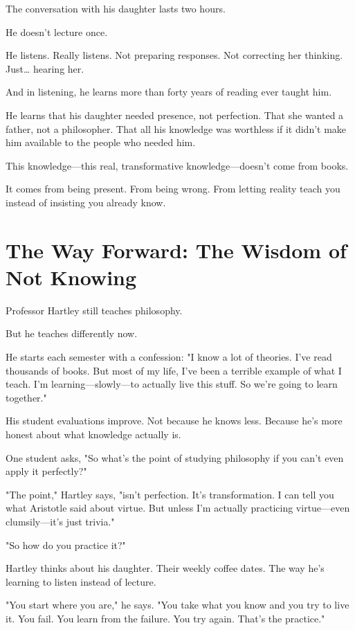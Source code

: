 \documentclass[11pt,twoside]{book}
\begin{document}
The conversation with his daughter lasts two hours.

He doesn't lecture once.

He listens. Really listens. Not preparing responses. Not correcting her thinking. Just\ldots{} hearing her.

And in listening, he learns more than forty years of reading ever taught him.

He learns that his daughter needed presence, not perfection. That she wanted a father, not a philosopher. That all his knowledge was worthless if it didn't make him available to the people who needed him.

This knowledge—this real, transformative knowledge—doesn't come from books.

It comes from being present. From being wrong. From letting reality teach you instead of insisting you already know.

\section*{The Way Forward: The Wisdom of Not Knowing}

Professor Hartley still teaches philosophy.

But he teaches differently now.

He starts each semester with a confession: "I know a lot of theories. I've read thousands of books. But most of my life, I've been a terrible example of what I teach. I'm learning—slowly—to actually live this stuff. So we're going to learn together."

His student evaluations improve. Not because he knows less. Because he's more honest about what knowledge actually is.

One student asks, "So what's the point of studying philosophy if you can't even apply it perfectly?"

"The point," Hartley says, "isn't perfection. It's transformation. I can tell you what Aristotle said about virtue. But unless I'm actually practicing virtue—even clumsily—it's just trivia."

"So how do you practice it?"

Hartley thinks about his daughter. Their weekly coffee dates. The way he's learning to listen instead of lecture.

"You start where you are," he says. "You take what you know and you try to live it. You fail. You learn from the failure. You try again. That's the practice."
\end{document}
